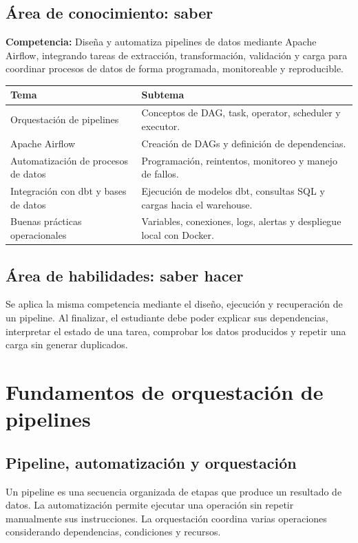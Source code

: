 \documentclass[12pt]{article}
\begin{document}
\subsection{Área de conocimiento: saber}
\textbf{Competencia:} Diseña y automatiza pipelines de datos mediante Apache Airflow, integrando tareas de extracción, transformación, validación y carga para coordinar procesos de datos de forma programada, monitoreable y reproducible.
\begin{longtable}{@{}p{}p{}@{}}
\toprule
\textbf{Tema} & \textbf{Subtema} \\
\midrule
Orquestación de pipelines & Conceptos de DAG, task, operator, scheduler y executor. \\
Apache Airflow & Creación de DAGs y definición de dependencias. \\
Automatización de procesos de datos & Programación, reintentos, monitoreo y manejo de fallos. \\
Integración con dbt y bases de datos & Ejecución de modelos dbt, consultas SQL y cargas hacia el warehouse. \\
Buenas prácticas operacionales & Variables, conexiones, logs, alertas y despliegue local con Docker. \\
\bottomrule
\end{longtable}

\subsection{Área de habilidades: saber hacer}
Se aplica la misma competencia mediante el diseño, ejecución y recuperación de un pipeline. Al finalizar, el estudiante debe poder explicar sus dependencias, interpretar el estado de una tarea, comprobar los datos producidos y repetir una carga sin generar duplicados.



\section{Fundamentos de orquestación de pipelines}
\subsection{Pipeline, automatización y orquestación}
Un pipeline es una secuencia organizada de etapas que produce un resultado de datos. La automatización permite ejecutar una operación sin repetir manualmente sus instrucciones. La orquestación coordina varias operaciones considerando dependencias, condiciones y recursos.
\end{document}
